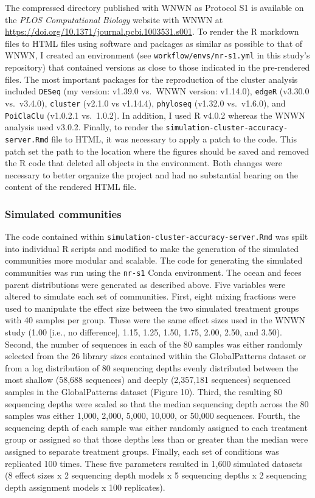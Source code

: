 \documentclass[
]{article}
\begin{document}
The compressed directory published with WNWN as Protocol S1 is available
on the \emph{PLOS Computational Biology} website with WNWN at
\url{https://doi.org/10.1371/journal.pcbi.1003531.s001}. To render the R
markdown files to HTML files using software and packages as similar as
possible to that of WNWN, I created an environment (see
\texttt{workflow/envs/nr-s1.yml} in this study's repository) that
contained versions as close to those indicated in the pre-rendered
files. The most important packages for the reproduction of the cluster
analysis included \texttt{DESeq} (my version: v1.39.0 vs.~WNWN version:
v1.14.0), \texttt{edgeR} (v3.30.0 vs.~v3.4.0), \texttt{cluster} (v2.1.0
vs v1.14.4), \texttt{phyloseq} (v1.32.0 vs.~v1.6.0), and
\texttt{PoiClaClu} (v1.0.2.1 vs.~1.0.2). In addition, I used R v4.0.2
whereas the WNWN analysis used v3.0.2. Finally, to render the
\texttt{simulation-cluster-accuracy-server.Rmd} file to HTML, it was
necessary to apply a patch to the code. This patch set the path to the
location where the figures should be saved and removed the R code that
deleted all objects in the environment. Both changes were necessary to
better organize the project and had no substantial bearing on the
content of the rendered HTML file.

\hypertarget{simulated-communities}{%
\subsubsection{Simulated communities}\label{simulated-communities}}

The code contained within
\texttt{simulation-cluster-accuracy-server.Rmd} was spilt into
individual R scripts and modified to make the generation of the
simulated communities more modular and scalable. The code for generating
the simulated communities was run using the \texttt{nr-s1} Conda
environment. The ocean and feces parent distributions were generated as
described above. Five variables were altered to simulate each set of
communities. First, eight mixing fractions were used to manipulate the
effect size between the two simulated treatment groups with 40 samples
per group. These were the same effect sizes used in the WNWN study (1.00
{[}i.e., no difference{]}, 1.15, 1.25, 1.50, 1.75, 2.00, 2.50, and
3.50). Second, the number of sequences in each of the 80 samples was
either randomly selected from the 26 library sizes contained within the
GlobalPatterns dataset or from a log distribution of 80 sequencing
depths evenly distributed between the most shallow (58,688 sequences)
and deeply (2,357,181 sequences) sequenced samples in the GlobalPatterns
dataset (Figure 10). Third, the resulting 80 sequencing depths were
scaled so that the median sequencing depth across the 80 samples was
either 1,000, 2,000, 5,000, 10,000, or 50,000 sequences. Fourth, the
sequencing depth of each sample was either randomly assigned to each
treatment group or assigned so that those depths less than or greater
than the median were assigned to separate treatment groups. Finally,
each set of conditions was replicated 100 times. These five parameters
resulted in 1,600 simulated datasets (8 effect sizes x 2 sequencing
depth models x 5 sequencing depths x 2 sequencing depth assignment
models x 100 replicates).
\end{document}
